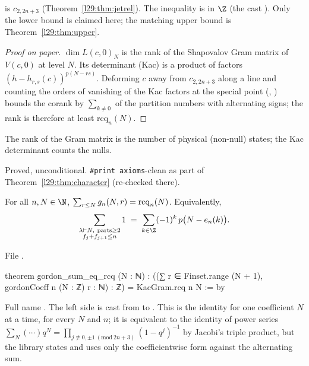 \begin{dictionary}
 is $c_{2,2n+3}$ (Theorem~\ref{l29:thm:jetrel}). The inequality is in $\Z$ (the cast ).
Only the lower bound is claimed here; the matching upper bound is Theorem~\ref{l29:thm:upper}.
\end{dictionary}

\begin{proof}[Proof on paper]
$\dim L(c,0)_N$ is the rank of the Shapovalov Gram matrix of $V(c,0)$ at level $N$. Its determinant (Kac) is a product
of factors $(h-h_{r,s}(c))^{p(N-rs)}$. Deforming $c$ away from $c_{2,2n+3}$ along a line and counting the orders of
vanishing of the Kac factors at the special point (, ) bounds the corank by
$\sum_{k\ne0}$ of the partition numbers with alternating signs; the rank is therefore at least $\mathrm{rcq}_n(N)$.
\end{proof}

\begin{physics}
The rank of the Gram matrix is the number of physical (non-null) states; the Kac determinant counts the nulls.
\end{physics}

\begin{status}
Proved, unconditional. \texttt{\#print axioms}-clean as part of Theorem~\ref{l29:thm:character} (re-checked there).
\end{status}

\begin{theorem}\label{l29:thm:ag}
For all $n,N\in\N$, $\sum_{r\le N}g_n(N,r)=\mathrm{rcq}_n(N)$. Equivalently,
\begin{equation*}
\sum_{\substack{\lambda\vdash N,\ \text{parts}\ge2\\ f_j+f_{j+1}\le n}}1\;=\;\sum_{k\in\Z}(-1)^k\,p\bigl(N-e_n(k)\bigr).
\end{equation*}
\end{theorem}

\noindent File .
\begin{leancode}
theorem gordon_sum_eq_rcq (N : ℕ) :
    ((∑ r ∈ Finset.range (N + 1), gordonCoeff n (N : ℤ) r : ℕ) : ℤ) = KacGram.rcq n N := by
\end{leancode}

\begin{dictionary}
Full name . The left side is cast from  to . This is
the identity for one coefficient $N$ at a time, for every $N$ and $n$; it is equivalent to the identity of power
series $\sum_N(\cdots)q^N=\prod_{j\not\equiv0,\pm1\ (\mathrm{mod}\ 2n+3)}(1-q^j)^{-1}$ by Jacobi's triple product,
but the library states and uses only the coefficientwise form against the alternating sum.
\end{dictionary}

